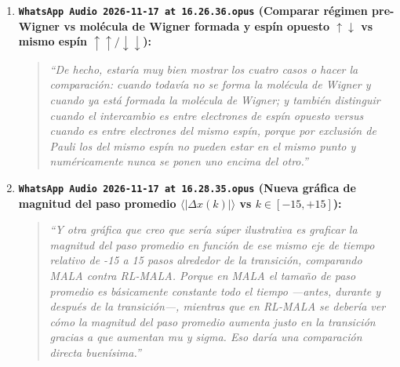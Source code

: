 \documentclass[10pt,a4paper]{article}
\begin{document}
\begin{enumerate}
\begin{quote}
  \textit{``Oye, ya vi las nuevas gráficas que mandaste. Está muy bien porque efectivamente se ve que la sigma y la mu están correlacionadas con la transición, como que aumentan antes de que ocurra la transición. Pero creo que poner las curvas encima del mapa de calor como que satura mucho la gráfica; mejor sácalas a un panel aparte o a otra gráfica aparte para que el mapa de calor quede limpio. Luego, en la gráfica donde pones las posiciones de los electrones antes y después del flip, hay dos cosas curiosas: una es que los electrones que no hacen flip como que se recorren un poquito hacia las orillas de los picos; y la otra es que justo en la transición los dos electrones que hacen flip aparecen súper pegados, casi uno encima del otro, y como que no queda claro si ya se brincaron o si todavía están del mismo lado. También me quedó la duda de si ese ejemplo que pusiste es cuando ya se formó la molécula de Wigner o todavía no.''}
  \end{quote}
\item \textbf{\texttt{WhatsApp Audio 2026-11-17 at 16.26.36.opus} (Comparar régimen pre-Wigner vs molécula de Wigner formada y espín opuesto $\uparrow\downarrow$ vs mismo espín $\uparrow\uparrow/\downarrow\downarrow$):}
  \begin{quote}
  \textit{``De hecho, estaría muy bien mostrar los cuatro casos o hacer la comparación: cuando todavía no se forma la molécula de Wigner y cuando ya está formada la molécula de Wigner; y también distinguir cuando el intercambio es entre electrones de espín opuesto versus cuando es entre electrones del mismo espín, porque por exclusión de Pauli los del mismo espín no pueden estar en el mismo punto y numéricamente nunca se ponen uno encima del otro.''}
  \end{quote}
\item \textbf{\texttt{WhatsApp Audio 2026-11-17 at 16.28.35.opus} (Nueva gráfica de magnitud del paso promedio $\langle |\Delta x(k)| \rangle$ vs $k \in [-15, +15]$):}
  \begin{quote}
  \textit{``Y otra gráfica que creo que sería súper ilustrativa es graficar la magnitud del paso promedio en función de ese mismo eje de tiempo relativo de -15 a 15 pasos alrededor de la transición, comparando MALA contra RL-MALA. Porque en MALA el tamaño de paso promedio es básicamente constante todo el tiempo —antes, durante y después de la transición—, mientras que en RL-MALA se debería ver cómo la magnitud del paso promedio aumenta justo en la transición gracias a que aumentan mu y sigma. Eso daría una comparación directa buenísima.''}
  \end{quote}
\end{enumerate}
\end{document}
